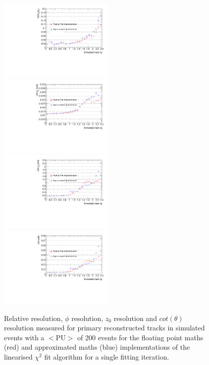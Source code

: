 \begin{figure}[htb]
\centering
\includegraphics[width=0.495\textwidth]{figs/tk-upgrade/results-chi2fitter/ptRelResVsEta_It_1_ApproxVsExact.pdf}
\includegraphics[width=0.495\textwidth]{figs/tk-upgrade/results-chi2fitter/phi0ResVsEta_It_1_ApproxVsExact.pdf}
\\
\includegraphics[width=0.495\textwidth]{figs/tk-upgrade/results-chi2fitter/z0ResVsEta_It_1_ApproxVsExact.pdf}
\includegraphics[width=0.495\textwidth]{figs/tk-upgrade/results-chi2fitter/cotThetaResVsEta_It_1_ApproxVsExact.pdf}
\caption{
Relative \pt resolution, $\phi$ resolution, $z_{0}$ resolution and $cot(\theta)$ resolution measured for primary reconstructed tracks in simulated \ttbar events with a $<\textrm{PU}>$ of 200 events for the floating point maths (red) and approximated maths (blue) implementations of the linearised $\chi^{2}$ fit algorithm for a single fitting iteration.
}
\label{fig:chi2HelixParametersResVsEtaApproxVsExact}
\end{figure}


